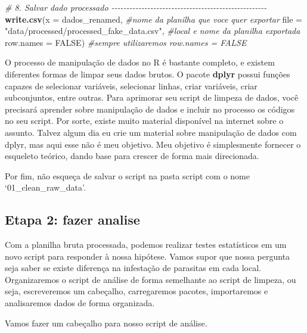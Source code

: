 \documentclass[
]{book}
\newenvironment{Shaded}{\begin{snugshade}}{\end{snugshade}}
\newcommand{\AttributeTok}[1]{\textcolor[rgb]{0.13,0.29,0.53}{#1}}
\newcommand{\CommentTok}[1]{\textcolor[rgb]{0.56,0.35,0.01}{\textit{#1}}}
\newcommand{\ConstantTok}[1]{\textcolor[rgb]{0.56,0.35,0.01}{#1}}
\newcommand{\FunctionTok}[1]{\textcolor[rgb]{0.13,0.29,0.53}{\textbf{#1}}}
\newcommand{\NormalTok}[1]{#1}
\newcommand{\StringTok}[1]{\textcolor[rgb]{0.31,0.60,0.02}{#1}}
\begin{document}
\begin{Shaded}
\begin{Highlighting}[]
\CommentTok{\# 8. Salvar dado processado {-}{-}{-}{-}{-}{-}{-}{-}{-}{-}{-}{-}{-}{-}{-}{-}{-}{-}{-}{-}{-}{-}{-}{-}{-}{-}{-}{-}{-}{-}{-}{-}{-}{-}{-}{-}{-}{-}{-}{-}{-}{-}{-}{-}{-}{-}{-}{-}{-}{-}{-}{-}}
\FunctionTok{write.csv}\NormalTok{(}\AttributeTok{x =}\NormalTok{ dados\_renamed,    }\CommentTok{\#nome da planilha que voce quer exportar}
          \AttributeTok{file =} \StringTok{"data/processed/processed\_fake\_data.csv"}\NormalTok{, }\CommentTok{\#local e nome da planilha exportada}
          \AttributeTok{row.names =} \ConstantTok{FALSE}\NormalTok{)  }\CommentTok{\#sempre utilizaremos row.names = FALSE}
\end{Highlighting}
\end{Shaded}

O processo de manipulação de dados no R é bastante completo, e existem diferentes formas de limpar seus dados brutos. O pacote \textbf{dplyr} possui funções capazes de selecionar variáveis, selecionar linhas, criar variáveis, criar subconjuntos, entre outras. Para aprimorar seu script de limpeza de dados, você precisará aprender sobre manipulação de dados e incluir no processo os códigos no seu script. Por sorte, existe muito material disponível na internet sobre o assunto. Talvez algum dia eu crie um material sobre manipulação de dados com dplyr, mas aqui esse não é meu objetivo. Meu objetivo é simplesmente fornecer o esqueleto teórico, dando base para crescer de forma mais direcionada.

Por fim, não esqueça de salvar o script na pasta script com o nome `01\_clean\_raw\_data'.

\hypertarget{etapa-2-fazer-analise}{%
\subsection{Etapa 2: fazer analise}\label{etapa-2-fazer-analise}}

Com a planilha bruta processada, podemos realizar testes estatísticos em um novo script para responder à nossa hipótese. Vamos supor que nossa pergunta seja saber se existe diferença na infestação de parasitas em cada local. Organizaremos o script de análise de forma semelhante ao script de limpeza, ou seja, escreveremos um cabeçalho, carregaremos pacotes, importaremos e analisaremos dados de forma organizada.

Vamos fazer um cabeçalho para nosso script de análise.
\end{document}
